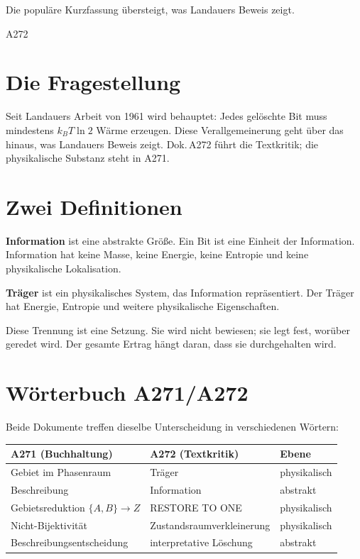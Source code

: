 \label{ch:traeger}

\epigraph{Die populäre Kurzfassung übersteigt, was Landauers Beweis zeigt.}{A272}

\section{Die Fragestellung}

Seit Landauers Arbeit von 1961 wird behauptet: Jedes gelöschte Bit muss mindestens
$k_BT\ln 2$ Wärme erzeugen. Diese Verallgemeinerung geht über das hinaus, was
Landauers Beweis zeigt. Dok.\,A272 führt die Textkritik; die physikalische Substanz
steht in A271.

\section{Zwei Definitionen}

\textbf{Information} ist eine abstrakte Größe. Ein Bit ist eine Einheit der
Information. Information hat keine Masse, keine Energie, keine Entropie und keine
physikalische Lokalisation.

\textbf{Träger} ist ein physikalisches System, das Information repräsentiert.
Der Träger hat Energie, Entropie und weitere physikalische Eigenschaften.

Diese Trennung ist eine Setzung. Sie wird nicht bewiesen; sie legt fest, worüber
geredet wird. Der gesamte Ertrag hängt daran, dass sie durchgehalten wird.

\section{Wörterbuch A271/A272}

Beide Dokumente treffen dieselbe Unterscheidung in verschiedenen Wörtern:

\begin{center}
\begingroup\small
\begin{tabular}{@{}p{2.8cm}p{2.8cm}p{2.0cm}@{}}
\toprule
\textbf{A271 (Buchhaltung)} & \textbf{A272 (Textkritik)} & \textbf{Ebene} \\
\midrule
Gebiet im Phasenraum & Träger & physikalisch \\
Beschreibung & Information & abstrakt \\
Gebietsreduktion $\{A,B\}\to Z$ & RESTORE TO ONE & physikalisch \\
Nicht-Bijektivität & Zustandsraumverkleinerung & physikalisch \\
Beschreibungsentscheidung & interpretative Löschung & abstrakt \\
\bottomrule
\end{tabular}
\endgroup
\end{center}

